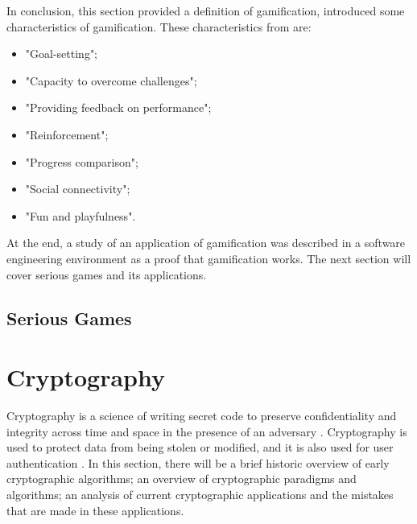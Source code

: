 \documentclass{l4proj}
\begin{document}
In conclusion, this section provided a definition of gamification, introduced some characteristics of gamification. 
These characteristics from \citet{cugelman_gamification:_2013} are:
\begin{itemize}
    \item "Goal-setting";
    \item "Capacity to overcome challenges";
    \item "Providing feedback on performance";
    \item "Reinforcement";
    \item "Progress comparison";
    \item "Social connectivity";
    \item "Fun and playfulness".
\end{itemize}
At the end, a study of an application of gamification was described in a software engineering environment as a proof that gamification works.
The next section will cover serious games and its applications.

\subsection{Serious Games}

\section{Cryptography}

Cryptography is a science of writing secret code to preserve confidentiality and integrity across time and space in the presence of an adversary \citep{kessler_overview_2016} 
\citep{savage_cse_2019}. Cryptography is used to protect data from being stolen or modified, and it is also used for user authentication \citep{kessler_overview_2016}. 
In this section, there will be a brief historic overview of early cryptographic algorithms; an overview of cryptographic paradigms and algorithms; 
an analysis of current cryptographic applications and the mistakes that are made in these applications.
\end{document}
